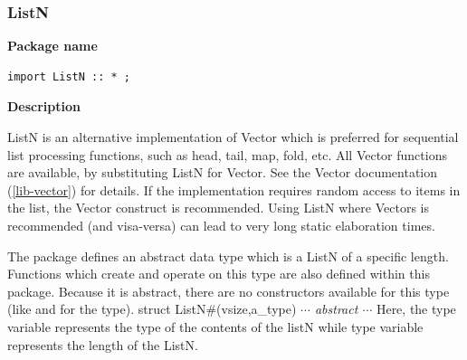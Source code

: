 \subsubsection{ListN}


{\bf Package name}


\begin{verbatim}
import ListN :: * ;
\end{verbatim}

{\bf Description}

ListN is an alternative implementation of Vector which is
preferred for sequential list processing functions, such as head, tail, map,
fold, etc.  All Vector functions are available, by substituting
ListN for Vector.  See the Vector documentation (\ref{lib-vector})
for details.  If the implementation requires random access to
items in the list, the Vector construct is recommended.  Using
ListN where Vectors is recommended (and visa-versa) can lead to
very long static elaboration times. 

The {}  package defines an abstract data type which is
a ListN of a specific length.  Functions which create and operate
on this type are also defined within this package.
Because it is abstract, there are no constructors available for this type
(like {} and {} for the {} type).
\BBS
 struct ListN\#(vsize,a\_type) 
       {\rm{\emph{$\cdots$ abstract $\cdots$}}}
\EBS
Here, the type variable {} represents the type of the
contents of the listN 
while type variable {} represents the length of the
ListN.
